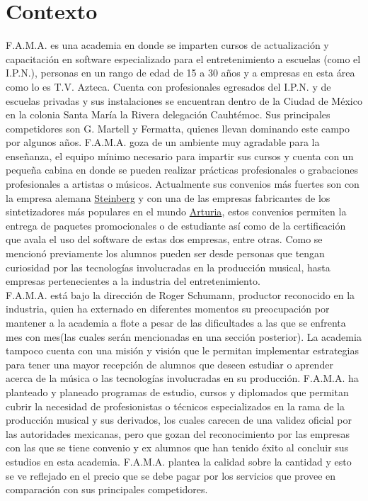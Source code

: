 
\section{Contexto}

F.A.M.A. es una academia en donde se imparten cursos de actualización y capacitación en software especializado para el entretenimiento a escuelas (como el I.P.N.), personas en un rango de edad de 15 a 30 años y a empresas en esta área como lo es T.V. Azteca. Cuenta con profesionales egresados del I.P.N. y de escuelas privadas y sus instalaciones se encuentran dentro de la Ciudad de México en la colonia Santa María la Rivera delegación Cauhtémoc. Sus principales competidores son G. Martell y Fermatta, quienes llevan dominando este campo por algunos años. F.A.M.A. goza de un ambiente muy agradable para la enseñanza, el equipo mínimo necesario para impartir sus cursos y cuenta con un pequeña cabina en donde se pueden realizar prácticas profesionales o grabaciones profesionales a artistas o músicos. Actualmente sus convenios más fuertes son con la empresa alemana \href{https://www.steinberg.net/en/products/cubase/start.html}{Steinberg} y con una de las empresas fabricantes de los sintetizadores más populares en el mundo \href{https://www.arturia.com/}{Arturia}, estos convenios permiten la entrega de paquetes promocionales o de estudiante así como de la certificación que avala el uso del software de estas dos empresas, entre otras. Como se mencionó previamente los alumnos pueden ser desde personas que tengan curiosidad por las tecnologías involucradas en la producción musical, hasta empresas pertenecientes a la industria del entretenimiento.\\

F.A.M.A. está bajo la dirección de Roger Schumann, productor reconocido en la industria, quien ha externado en diferentes momentos su preocupación por mantener a la academia a flote a pesar de las dificultades a las que se enfrenta mes con mes(las cuales serán mencionadas en una sección posterior). La academia tampoco cuenta con una misión y visión que le permitan implementar estrategias para tener una mayor recepción de alumnos que deseen estudiar o aprender acerca de la música o las tecnologías involucradas en su producción. F.A.M.A. ha planteado y planeado programas de estudio, cursos y diplomados que permitan cubrir la necesidad de profesionistas o técnicos especializados en la rama de la producción musical y sus derivados, los cuales carecen de una validez oficial por las autoridades mexicanas, pero que gozan del reconocimiento por las empresas con las que se tiene convenio y ex alumnos que han tenido éxito al concluir sus estudios en esta academia. F.A.M.A. plantea la calidad sobre la cantidad y esto se ve reflejado en el precio que se debe pagar por los servicios que provee en comparación con sus principales competidores.


